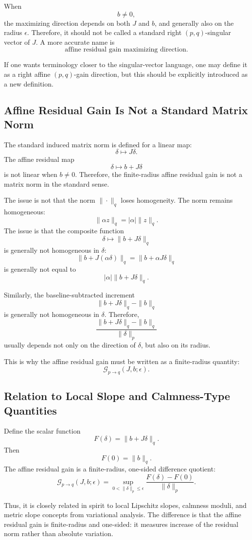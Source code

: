 \documentclass{article}
\begin{document}
When
\[
b\neq0,
\]
the maximizing direction depends on both $J$ and $b$, and generally also on the radius $\epsilon$. Therefore, it should not be called a standard right $(p,q)$-singular vector of $J$. A more accurate name is
\[
\text{affine residual gain maximizing direction}.
\]

If one wants terminology closer to the singular-vector language, one may define it as a right affine $(p,q)$-gain direction, but this should be explicitly introduced as a new definition.

\subsection{Affine Residual Gain Is Not a Standard Matrix Norm}

The standard induced matrix norm is defined for a linear map:
\[
\delta\mapsto J\delta.
\]
The affine residual map
\[
\delta\mapsto b+J\delta
\]
is not linear when $b\neq0$. Therefore, the finite-radius affine residual gain is not a matrix norm in the standard sense.

The issue is not that the norm $\|\cdot\|_q$ loses homogeneity. The norm remains homogeneous:
\[
\|\alpha z\|_q=|\alpha|\|z\|_q.
\]
The issue is that the composite function
\[
\delta\mapsto \|b+J\delta\|_q
\]
is generally not homogeneous in $\delta$:
\[
\|b+J(\alpha\delta)\|_q
=
\|b+\alpha J\delta\|_q
\]
is generally not equal to
\[
|\alpha|\|b+J\delta\|_q.
\]

Similarly, the baseline-subtracted increment
\[
\|b+J\delta\|_q-\|b\|_q
\]
is generally not homogeneous in $\delta$. Therefore,
\[
\frac{
\|b+J\delta\|_q-\|b\|_q
}{
\|\delta\|_p
}
\]
usually depends not only on the direction of $\delta$, but also on its radius.

This is why the affine residual gain must be written as a finite-radius quantity:
\[
\mathcal G_{p\to q}(J,b;\epsilon).
\]

\subsection{Relation to Local Slope and Calmness-Type Quantities}

Define the scalar function
\[
F(\delta)=\|b+J\delta\|_q.
\]
Then
\[
F(0)=\|b\|_q.
\]
The affine residual gain is a finite-radius, one-sided difference quotient:
\[
\mathcal G_{p\to q}(J,b;\epsilon)
=
\sup_{0<\|\delta\|_p\le\epsilon}
\frac{F(\delta)-F(0)}{\|\delta\|_p}.
\]

Thus, it is closely related in spirit to local Lipschitz slopes, calmness moduli, and metric slope concepts from variational analysis. The difference is that the affine residual gain is finite-radius and one-sided: it measures increase of the residual norm rather than absolute variation.
\end{document}
